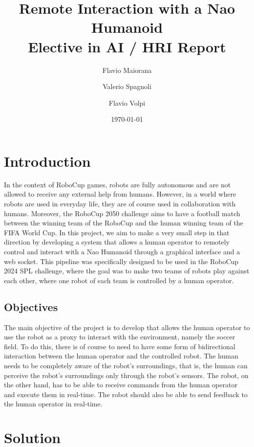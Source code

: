 \documentclass[a4paper, onecolumn, 12pt]{article}
\title{Remote Interaction with a Nao Humanoid \\ Elective in AI / HRI Report}
\author{Flavio Maiorana \and Valerio Spagnoli \and Flavio Volpi}
\date{\today}
\begin{document}
\maketitle

\section{Introduction}
\label{sec:intro}

In the context of RoboCup games, robots are fully autonomous and are not allowed
to receive any external help from humans. However, in a world where robots are
used in everyday life, they are of course used in collaboration with humans.
Moreover, the RoboCup 2050 challenge aims to have a football match between the
winning team of the RoboCup and the human winning team of the FIFA World Cup. In
this project, we aim to make a very small step in that direction by developing a
system that allows a human operator to remotely control and interact with a Nao
Humanoid through a graphical interface and a web socket. This pipeline was
specifically designed to be used in the RoboCup 2024 SPL challenge, where the
goal was to make two teams of robots play against each other, where one robot of
each team is controlled by a human operator.

\subsection{Objectives}
\label{sec:obj}

The main objective of the project is to develop that allows the human operator
to use the robot as a proxy to interact with the environment, namely the soccer
field. To do this, there is of course to need to have some form of bidirectional
interaction between the human operator and the controlled robot. The human needs
to be completely aware of the robot's surroundings, that is, the human can
perceive the robot's surroundings only through the robot's sensors. The robot,
on the other hand, has to be able to receive commands from the human operator
and execute them in real-time. The robot should also be able to send feedback to
the human operator in real-time. 


\section{Solution}
\label{sec:sol}
\end{document}
